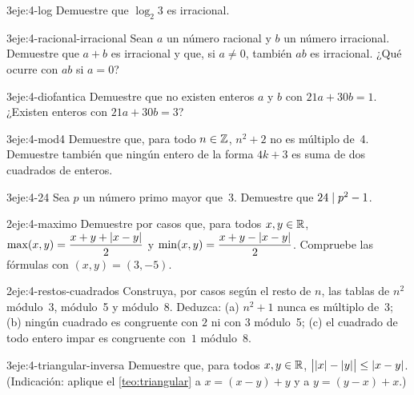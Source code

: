 \begin{ejercicio}{3}{eje:4-log}
Demuestre que $\log_{2}3$ es irracional.
\end{ejercicio}

\begin{ejercicio}{3}{eje:4-racional-irracional}
Sean $a$ un número racional y $b$ un número irracional. Demuestre que $a+b$ es irracional y que, si $a\neq 0$, también $ab$ es irracional. ¿Qué ocurre con $ab$ si $a=0$?
\end{ejercicio}

\begin{ejercicio}{3}{eje:4-diofantica}
Demuestre que no existen enteros $a$ y $b$ con $21a+30b=1$. ¿Existen enteros con $21a+30b=3$?
\end{ejercicio}

\begin{ejercicio}{3}{eje:4-mod4}
Demuestre que, para todo $n\in\mathbb{Z}$, $n^{2}+2$ no es múltiplo de~4. Demuestre también que ningún entero de la forma $4k+3$ es suma de dos cuadrados de enteros.
\end{ejercicio}

\begin{ejercicio}{3}{eje:4-24}
Sea $p$ un número primo mayor que~3. Demuestre que $24\mid p^{2}-1$.
\end{ejercicio}

\begin{ejercicio}{2}{eje:4-maximo}
Demuestre por casos que, para todos $x,y\in\mathbb{R}$, $\max(x,y)=\dfrac{x+y+\lvert x-y\rvert}{2}$ y $\min(x,y)=\dfrac{x+y-\lvert x-y\rvert}{2}$. Compruebe las fórmulas con $(x,y)=(3,-5)$.
\end{ejercicio}

\begin{ejercicio}{2}{eje:4-restos-cuadrados}
Construya, por casos según el resto de $n$, las tablas de $n^{2}$ módulo~3, módulo~5 y módulo~8. Deduzca: (a) $n^{2}+1$ nunca es múltiplo de~3; (b) ningún cuadrado es congruente con $2$ ni con $3$ módulo~5; (c) el cuadrado de todo entero impar es congruente con~$1$ módulo~8.
\end{ejercicio}

\begin{ejercicio}{3}{eje:4-triangular-inversa}
Demuestre que, para todos $x,y\in\mathbb{R}$, $\bigl\lvert\lvert x\rvert-\lvert y\rvert\bigr\rvert\le\lvert x-y\rvert$. (Indicación: aplique el \cref{teo:triangular} a $x=(x-y)+y$ y a $y=(y-x)+x$.)
\end{ejercicio}

